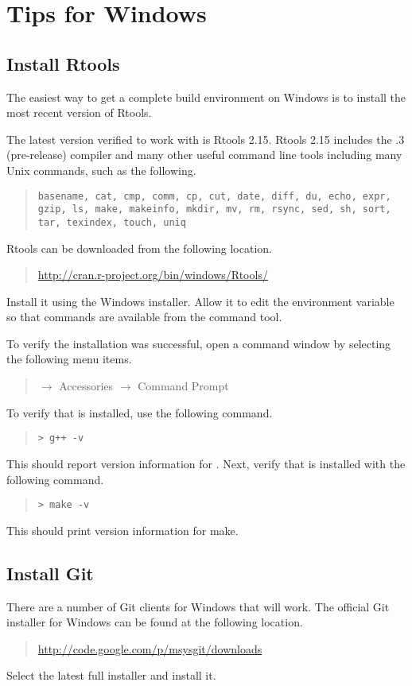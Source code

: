 \section{Tips for Windows}

\subsection{Install Rtools}

The easiest way to get a complete \Cpp build environment on Windows is
to install the most recent version of Rtools.  

The latest version verified to work with \Stan is Rtools 2.15.  Rtools
2.15 includes the .3 (pre-release) compiler and many other
useful command line tools including many Unix commands, such as the
following.
%
\begin{quote}
\tt basename, cat, cmp, comm, cp, cut, date,
diff, du, echo, expr, gzip, ls, make, makeinfo, mkdir, mv, rm, rsync,
sed, sh, sort, tar, texindex, touch, uniq
\end{quote}

Rtools can be downloaded from the following location.
%
\begin{quote}
  \url{http://cran.r-project.org/bin/windows/Rtools/}
\end{quote}
%
Install it using the Windows installer.  Allow it to edit the
 environment variable so that commands are available from
the command tool.

To verify the installation was successful, open a command window by
selecting the following menu items.
%
\begin{quote}
  $\rightarrow$ Accessories 
  $\rightarrow$ Command Prompt
\end{quote}
%
To verify that \gpp is installed, use the following command.
%
\begin{quote}
  \verb|> g++ -v|
\end{quote}
%
This should report version information for \gpp.  Next, verify that
 is installed with the following command.
%
\begin{quote}
  \verb|> make -v|
\end{quote}
%
This should print version information for make.

\subsection{Install Git}

There are a number of Git clients for Windows that will work.  The
official Git installer for Windows can be found at the following
location.
%
\begin{quote}
\url{http://code.google.com/p/msysgit/downloads}
\end{quote}
%
Select the latest full installer and install it. 

